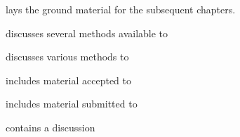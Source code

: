 
        lays the ground material for the subsequent chapters.

        discusses several methods available to

        discusses various methods to

        includes material accepted to

        includes material submitted to

        contains a discussion


